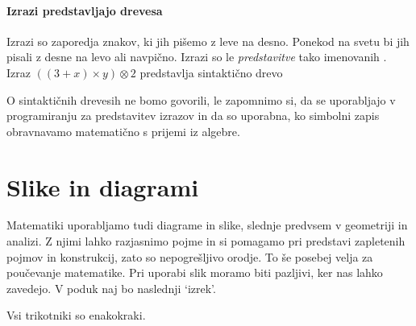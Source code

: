 \paragraph*{Izrazi predstavljajo drevesa}

Izrazi so zaporedja znakov, ki jih pišemo z leve na desno. Ponekod na svetu bi jih pisali z desne na levo ali
navpično. Izrazi so le \emph{predstavitve} tako imenovanih . Izraz $((3 + x) \times y) \otimes 2$ predstavlja sintaktično drevo
%
\begin{center}
\end{center}
%
O sintaktičnih drevesih ne bomo govorili, le zapomnimo si, da se uporabljajo v programiranju za
predstavitev izrazov in da so uporabna, ko simbolni zapis obravnavamo matematično s prijemi iz algebre.


\section{Slike in diagrami}
\label{sec:slike-in-diagrami}

Matematiki uporabljamo tudi diagrame in slike, slednje predvsem v geometriji in analizi. Z
njimi lahko razjasnimo pojme in si pomagamo pri predstavi zapletenih pojmov in
konstrukcij, zato so nepogrešljivo orodje. To še posebej velja za poučevanje matematike.
%
Pri uporabi slik moramo biti pazljivi, ker nas lahko zavedejo. V poduk naj bo naslednji `izrek'.

\begin{izrek}[neveljaven]
  \label{izrek:trikotnik-enakokrak}%
  Vsi trikotniki so enakokraki.
\end{izrek}

